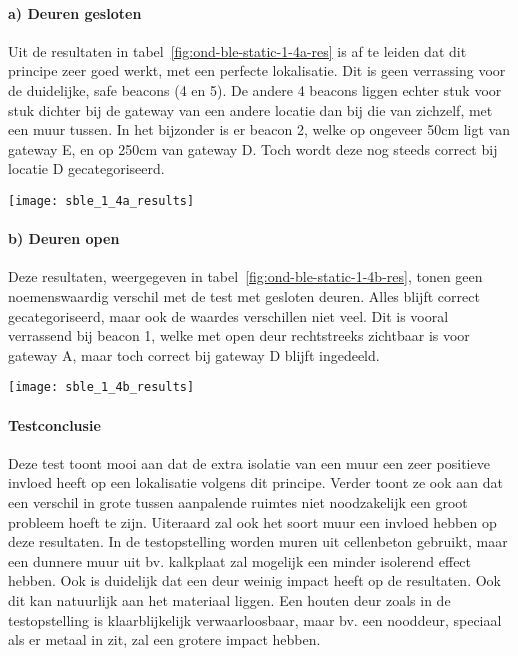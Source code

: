 \paragraph{a) Deuren gesloten}
\begin{minipage}{0.55\textwidth}
Uit de resultaten in tabel~\ref{fig:ond-ble-static-1-4a-res} is af te leiden dat dit principe zeer goed werkt, met een perfecte lokalisatie. Dit is geen verrassing voor de duidelijke, safe beacons (4 en 5). De andere 4 beacons liggen echter stuk voor stuk dichter bij de gateway van een andere locatie dan bij die van zichzelf, met een muur tussen. In het bijzonder is er beacon 2, welke op ongeveer 50cm ligt van gateway E, en op 250cm van gateway D. Toch wordt deze nog steeds correct bij locatie D gecategoriseerd.
\end{minipage}
\hfill
\begin{minipage}{0.42\textwidth}
	\texttt{[image: sble\_1\_4a\_results]}
	\label{fig:ond-ble-static-1-4a-res}
\end{minipage}

\paragraph{b) Deuren open}
\begin{minipage}{0.55\textwidth}
Deze resultaten, weergegeven in tabel~\ref{fig:ond-ble-static-1-4b-res}, tonen geen noemenswaardig verschil met de test met gesloten deuren. Alles blijft correct gecategoriseerd, maar ook de waardes verschillen niet veel. Dit is vooral verrassend bij beacon 1, welke met open deur rechtstreeks zichtbaar is voor gateway A, maar toch correct bij gateway D blijft ingedeeld.
\end{minipage}
\hfill
\begin{minipage}{0.42\textwidth}
	\texttt{[image: sble\_1\_4b\_results]}
	\label{fig:ond-ble-static-1-4b-res}
\end{minipage}

\paragraph{Testconclusie}
Deze test toont mooi aan dat de extra isolatie van een muur een zeer positieve invloed heeft op een lokalisatie volgens dit principe. Verder toont ze ook aan dat een verschil in grote tussen aanpalende ruimtes niet noodzakelijk een groot probleem hoeft te zijn. Uiteraard zal ook het soort muur een invloed hebben op deze resultaten. In de testopstelling worden muren uit cellenbeton gebruikt, maar een dunnere muur uit bv. kalkplaat zal mogelijk een minder isolerend effect hebben. Ook is duidelijk dat een deur weinig impact heeft op de resultaten. Ook dit kan natuurlijk aan het materiaal liggen. Een houten deur zoals in de testopstelling is klaarblijkelijk verwaarloosbaar, maar bv. een nooddeur, speciaal als er metaal in zit, zal een grotere impact hebben.

